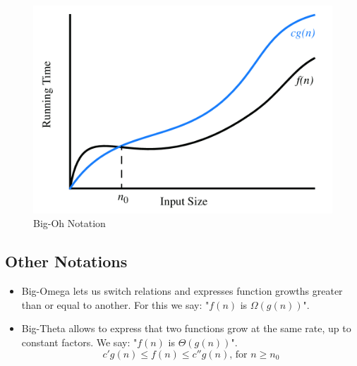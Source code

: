 \documentclass[../Main.tex]{subfiles}
\begin{document}
\begin{figure}[H]
    \centering
    \includegraphics[width=0.75\linewidth]{Images/onotation.png}
    \caption{Big-Oh Notation}
\end{figure}





\subsection{Other Notations}
\begin{itemize}
    \item Big-Omega lets us switch relations and expresses function growths greater than or equal to another.
    For this we say: "\(f(n)\) is \(\Omega(g(n))\)".
    \item Big-Theta allows to express that two functions grow at the same rate, up to constant factors.
    We say: "\(f(n)\) is \(\Theta(g(n))\)".
    \begin{equation}
        c'g(n) \leq f(n) \leq c''g(n) \text{, for } n \geq n_0
    \end{equation}
\end{itemize}
\end{document}
